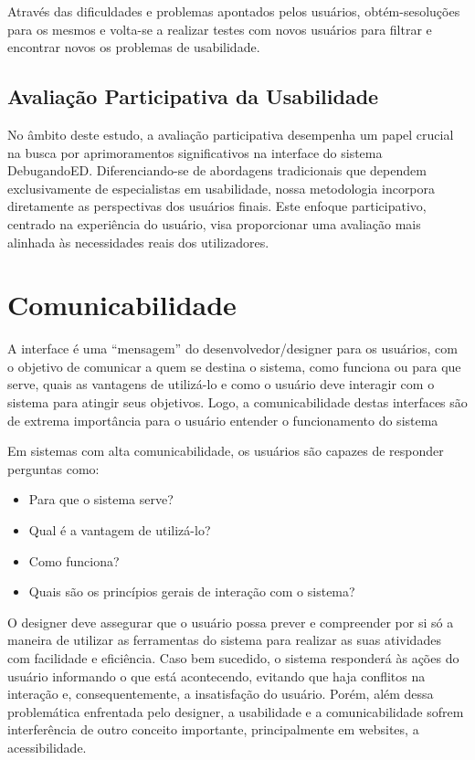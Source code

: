 Através das dificuldades e problemas apontados pelos usuários, obtém-sesoluções para os mesmos e volta-se a realizar testes com novos usuários para filtrar e encontrar novos os problemas de usabilidade.

\subsection{Avaliação Participativa da Usabilidade}
\label{Avaliação_Participativa_da_Usabilidade}

No âmbito deste estudo, a avaliação participativa desempenha um papel crucial na busca por aprimoramentos significativos na interface do sistema DebugandoED. Diferenciando-se de abordagens tradicionais que dependem exclusivamente de especialistas em usabilidade, nossa metodologia incorpora diretamente as perspectivas dos usuários finais. Este enfoque participativo, centrado na experiência do usuário, visa proporcionar uma avaliação mais alinhada às necessidades reais dos utilizadores.

\section{Comunicabilidade}
\label{Comunicabilidade}
A interface é uma “mensagem” do desenvolvedor/designer para os usuários, com o objetivo de comunicar a quem se destina o sistema, como funciona ou para que serve, quais as vantagens de utilizá-lo e como o usuário deve interagir com o sistema para atingir seus objetivos. Logo, a comunicabilidade destas interfaces são de extrema importância para o usuário entender o funcionamento do sistema \cite{normanDAODESIGNDODIA}

Em sistemas com alta comunicabilidade, os usuários são capazes de responder perguntas como:
\begin{itemize}
    \item Para que o sistema serve?
    \item Qual é a vantagem de utilizá-lo?
    \item Como funciona?
    \item Quais são os princípios gerais de interação com o sistema?
\end{itemize}

O designer deve assegurar que o usuário possa prever e compreender por si só a maneira de utilizar as ferramentas do sistema para realizar as suas atividades com facilidade e eficiência. Caso bem sucedido, o sistema responderá às ações do usuário informando o que está acontecendo, evitando que haja conflitos na interação e, consequentemente, a insatisfação do usuário. Porém, além dessa problemática enfrentada pelo designer, a usabilidade e a comunicabilidade sofrem interferência de outro conceito importante, principalmente em websites, a acessibilidade. 

